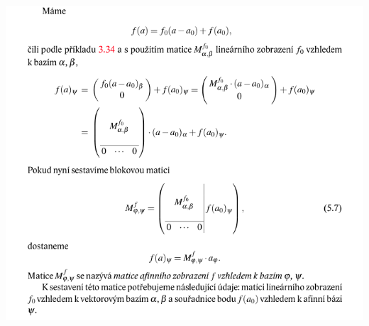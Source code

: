 \documentclass[12pt,a4paper]{article}
\begin{document}
\begin{center}
	\includegraphics[scale=0.6]{img/MaticeAfinnihoZobrazeni}
\end{center}
\end{document}
